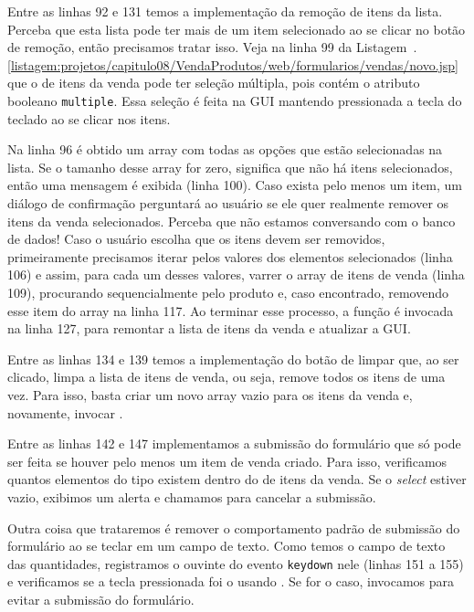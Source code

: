 Entre as linhas 92 e 131 temos a implementação da remoção de itens da lista. Perceba que esta lista pode ter mais de um item selecionado ao se clicar no botão de remoção, então precisamos tratar isso. Veja na linha 99 da Listagem~\thechapter.\ref{listagem:projetos/capitulo08/VendaProdutos/web/formularios/vendas/novo.jsp} que o  de itens da venda pode ter seleção múltipla, pois contém o atributo booleano \texttt{multiple}. Essa seleção é feita na GUI mantendo pressionada a tecla  do teclado ao se clicar nos itens.

Na linha 96 é obtido um array com todas as opções que estão selecionadas na lista. Se o tamanho desse array for zero, significa que não há itens selecionados, então uma mensagem é exibida (linha 100). Caso exista pelo menos um item, um diálogo de confirmação perguntará ao usuário se ele quer realmente remover os itens da venda selecionados. Perceba que não estamos conversando com o banco de dados! Caso o usuário escolha que os itens devem ser removidos, primeiramente precisamos iterar pelos valores dos elementos selecionados (linha 106) e assim, para cada um desses valores, varrer o array de itens de venda (linha 109), procurando sequencialmente pelo produto e, caso encontrado, removendo esse item do array na linha 117. Ao terminar esse processo, a função  é invocada na linha 127, para remontar a lista de itens da venda e atualizar a GUI.

Entre as linhas 134 e 139 temos a implementação do botão de limpar que, ao ser clicado, limpa a lista de itens de venda, ou seja, remove todos os itens de uma vez. Para isso, basta criar um novo array vazio para os itens da venda e, novamente, invocar .

Entre as linhas 142 e 147 implementamos a submissão do formulário que só pode ser feita se houver pelo menos um item de venda criado. Para isso, verificamos quantos elementos do tipo  existem dentro do  de itens da venda. Se o \textit{select} estiver vazio, exibimos um alerta e chamamos  para cancelar a submissão.

Outra coisa que trataremos é remover o comportamento padrão de submissão do formulário ao se teclar  em um campo de texto. Como temos o campo de texto das quantidades, registramos o ouvinte do evento \texttt{keydown} nele (linhas 151 a 155) e verificamos se a tecla pressionada foi o  usando . Se for o caso, invocamos  para evitar a submissão do formulário.

